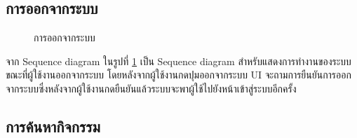 \documentclass[14pt,oneside,openright,a4paper]{cpe-thai-project}
\begin{document}
\newpage


\subsection{การออกจากระบบ}

  \begin{figure}[!h]\centering
    \setlength{\fboxrule}{0.5mm} %
    \setlength{\fboxsep}{0.5cm}
    \caption{การออกจากระบบ}\label{fig:logout}
  \end{figure}

  จาก Sequence diagram ในรูปที่ \ref{fig:logout} เป็น Sequence diagram สำหรับแสดงการทำงานของระบบขณะที่ผู้ใช้งานออกจากระบบ โดยหลังจากผู้ใช้งานกดปุมออกจากระบบ UI จะถามการยืนยันการออกจากระบบซึ่งหลังจากผู้ใช้งานกดยืนยันแล้วระบบจะพาผู้ใช้ไปยังหน้าเข้าสู่ระบบอีกครั้ง

\newpage

\subsection{การค้นหากิจกรรม}
\end{document}
